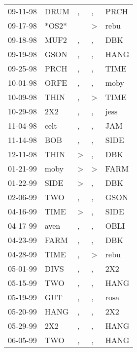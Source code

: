 \begin{supertabular}{lllll}
 09-11-98 &   DRUM &                , &             , &   PRCH \\
 09-17-98 &  *OS2* &                  &  \textgreater &   rebu \\
 09-18-98 &   MUF2 &                , &             , &    DBK \\
 09-19-98 &   GSON &                , &             , &   HANG \\
 09-25-98 &   PRCH &                , &             , &   TIME \\
 10-01-98 &   ORFE &                , &             , &   moby \\
 10-09-98 &   THIN &                , &  \textgreater &   TIME \\
 10-29-98 &    2X2 &                , &             , &   jess \\
 11-04-98 &   celt &                , &             , &    JAM \\
 11-14-98 &    BOB &                , &             , &   SIDE \\
 12-11-98 &   THIN &     \textgreater &             , &    DBK \\
 01-21-99 &   moby &     \textgreater &  \textgreater &   FARM \\
 01-22-99 &   SIDE &     \textgreater &             , &    DBK \\
 02-06-99 &    TWO &                , &             , &   GSON \\
 04-16-99 &   TIME &     \textgreater &             , &   SIDE \\
 04-17-99 &   aven &                , &             , &   OBLI \\
 04-23-99 &   FARM &                , &             , &    DBK \\
 04-28-99 &   TIME &                , &  \textgreater &   rebu \\
 05-01-99 &   DIVS &                , &             , &    2X2 \\
 05-15-99 &    TWO &                , &             , &   HANG \\
 05-19-99 &    GUT &                , &             , &   rosa \\
 05-20-99 &   HANG &                , &             , &    2X2 \\
 05-29-99 &    2X2 &                , &             , &   HANG \\
 06-05-99 &    TWO &                , &             , &   HANG \\

\end{supertabular}
